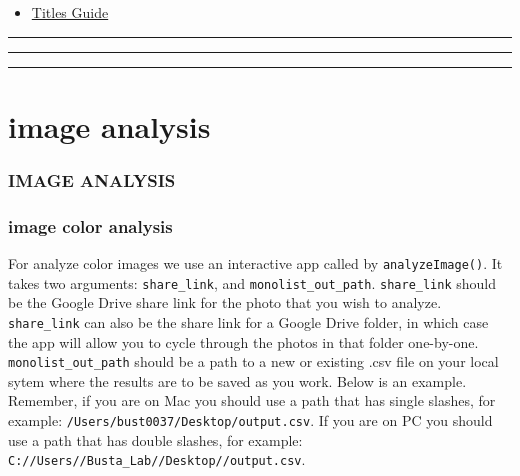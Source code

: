 \documentclass[
]{krantz}
\providecommand{\tightlist}{%
  \setlength{\itemsep}{0pt}\setlength{\parskip}{0pt}}
\begin{document}
\begin{itemize}
\tightlist
\item
  \href{https://libguides.usc.edu/writingguide/title}{Titles Guide}
\end{itemize}

\begin{center}\rule{0.5\linewidth}{0.5pt}\end{center}

\begin{center}\rule{0.5\linewidth}{0.5pt}\end{center}

\begin{center}\rule{0.5\linewidth}{0.5pt}\end{center}

\hypertarget{part-image-analysis}{%
\part{image analysis}\label{part-image-analysis}}

\hypertarget{section}{%
\section*{}\label{section}}

\hypertarget{image-analysis}{%
\section*{IMAGE ANALYSIS}\label{image-analysis}}

\hypertarget{image-color-analysis}{%
\section{image color analysis}\label{image-color-analysis}}

For analyze color images we use an interactive app called by \texttt{analyzeImage()}. It takes two arguments: \texttt{share\_link}, and \texttt{monolist\_out\_path}. \texttt{share\_link} should be the Google Drive share link for the photo that you wish to analyze. \texttt{share\_link} can also be the share link for a Google Drive folder, in which case the app will allow you to cycle through the photos in that folder one-by-one. \texttt{monolist\_out\_path} should be a path to a new or existing .csv file on your local sytem where the results are to be saved as you work. Below is an example. Remember, if you are on Mac you should use a path that has single slashes, for example: \texttt{/Users/bust0037/Desktop/output.csv}. If you are on PC you should use a path that has double slashes, for example: \texttt{C://Users//Busta\_Lab//Desktop//output.csv}.
\end{document}
